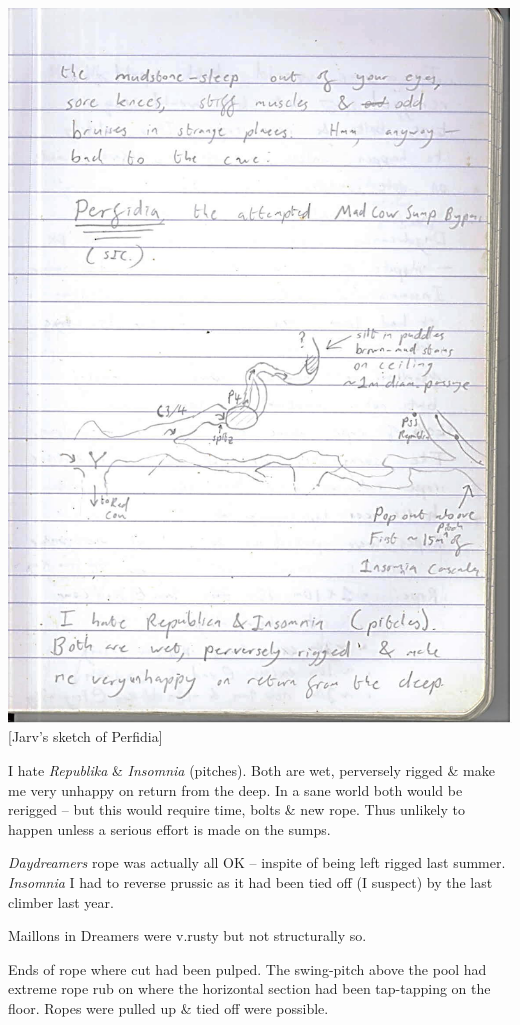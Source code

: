 \includegraphics{UgLog1012/64.jpeg}\\
{[}Jarv's sketch of Perfidia{]}

I hate \emph{Republika} \& \emph{Insomnia} (pitches). Both are wet,
perversely rigged \& make me very unhappy on return from the deep. In a
sane world both would be rerigged -- but this would require time, bolts
\& new rope. Thus unlikely to happen unless a serious effort is made on
the sumps.

\emph{Daydreamers} rope was actually all OK -- inspite of being left
rigged last summer. \emph{Insomnia} I had to reverse prussic as it had
been tied off (I suspect) by the last climber last year.

Maillons in Dreamers were v.rusty but not structurally so.

Ends of rope where cut had been pulped. The swing-pitch above the pool
had extreme rope rub on where the horizontal section had been
tap-tapping on the floor. Ropes were pulled up \& tied off were
possible.

